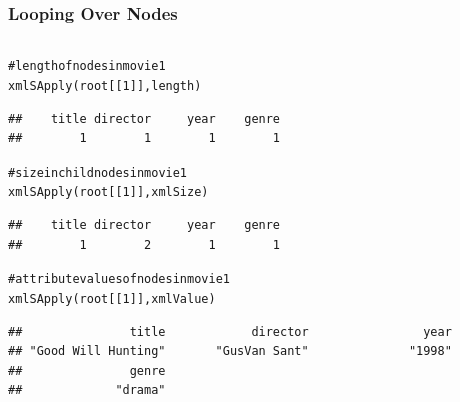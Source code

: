 \documentclass{beamer}\usepackage[]{graphicx}\usepackage[]{color}
\makeatletter
\newcommand{\hlnum}[1]{\textcolor[rgb]{0.063,0.58,0.627}{#1}}%
\newcommand{\hlcom}[1]{\textcolor[rgb]{0.588,0.588,0.588}{#1}}%
\newcommand{\hlstd}[1]{\textcolor[rgb]{0.196,0.196,0.196}{#1}}%
\newcommand{\hlkwd}[1]{\textcolor[rgb]{0.78,0.227,0.412}{#1}}%
\newenvironment{kframe}{%
 \def\at@end@of@kframe{}%
 \ifinner\ifhmode%
  \def\at@end@of@kframe{\end{minipage}}%
  \begin{minipage}{\columnwidth}%
 \fi\fi%
 \def\FrameCommand##1{\hskip\@totalleftmargin \hskip-\fboxsep
 \colorbox{shadecolor}{##1}\hskip-\fboxsep
     \hskip-\linewidth \hskip-\@totalleftmargin \hskip\columnwidth}%
 \MakeFramed {\advance\hsize-\width
   \@totalleftmargin\z@ \linewidth\hsize
   \@setminipage}}%
 {\par\unskip\endMakeFramed%
 \at@end@of@kframe}
\newenvironment{knitrout}{}{} %
\makeatother
\begin{document}

\begin{frame}[fragile]
\frametitle{Looping Over Nodes}

\begin{columns}[t]
\begin{column}{0.5\textwidth}
\begin{knitrout}\tiny
{}\color{fgcolor}\begin{kframe}
\begin{alltt}
\hlcom{# length of nodes in movie 1}
\hlkwd{xmlSApply}\hlstd{(root[[}\hlnum{1}\hlstd{]], length)}
\end{alltt}
\begin{verbatim}
##    title director     year    genre 
##        1        1        1        1
\end{verbatim}
\begin{alltt}
\hlcom{# size in child nodes in movie 1}
\hlkwd{xmlSApply}\hlstd{(root[[}\hlnum{1}\hlstd{]], xmlSize)}
\end{alltt}
\begin{verbatim}
##    title director     year    genre 
##        1        2        1        1
\end{verbatim}
\begin{alltt}
\hlcom{# attribute values of nodes in movie 1}
\hlkwd{xmlSApply}\hlstd{(root[[}\hlnum{1}\hlstd{]], xmlValue)}
\end{alltt}
\begin{verbatim}
##               title            director                year 
## "Good Will Hunting"       "GusVan Sant"              "1998" 
##               genre 
##             "drama"
\end{verbatim}
\end{kframe}
\end{knitrout}
\end{column}


\end{columns}
\end{frame}
\end{document}

